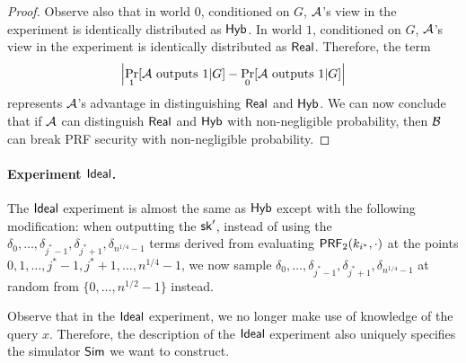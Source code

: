 \begin{proof}
Observe also that in world $0$, conditioned on $G$,
$\mathcal{A}$'s view in the experiment is identically distributed
as ${\sf Hyb}$.  
In world $1$, conditioned on $G$,
$\mathcal{A}$'s view in the experiment is identically distributed
as ${\sf Real}$.  
Therefore, the term 
\[\left|\Pr_1[ \mathcal{A} \text{ outputs } 1 | G]
-
\Pr_0[ \mathcal{A} \text{ outputs } 1 | G] \right|\]
represents $\mathcal{A}$'s advantage
in distinguishing ${\sf Real}$ and ${\sf Hyb}$.
We can now conclude that if $\mathcal{A}$ can distinguish
${\sf Real}$ and ${\sf Hyb}$ with non-negligible probability,
then $\mathcal{B}$ can break PRF security with non-negligible probability.
\end{proof}


\paragraph{Experiment ${\sf Ideal}$.}
The ${\sf Ideal}$ experiment 
is almost the same as ${\sf Hyb}$ except with the following modification: 
when outputting the $\mathsf{sk}'$, 
instead of using the $\delta_0, 
\ldots, \delta_{j^*-1},  
\delta_{j^*+1},  
\delta_{n^{1/4}-1}$
terms derived from evaluating $\mathsf{PRF}_2(k_{i^*}, \cdot)$ 
at the points $0, 1, \ldots, j^*-1, j^*+1, \ldots, n^{1/4} -1$, 
we now sample $\delta_0,  
\ldots, \delta_{j^*-1},  
\delta_{j^*+1},  
\delta_{n^{1/4}-1}$
at random from $\{0, \ldots, n^{1/2}-1\}$ instead.

Observe that in the 
${\sf Ideal}$
experiment, we no longer make use of knowledge of the query $x$.
Therefore, %
the description of the ${\sf Ideal}$ 
experiment also uniquely specifies the simulator ${\sf Sim}$
we want to construct.

